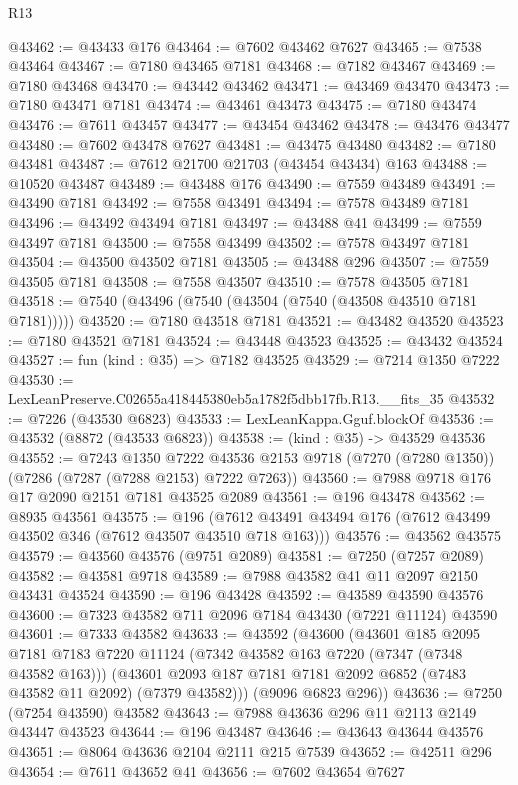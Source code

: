 \begin{lexlean}{R13}
\begin{coremodule}
@43462 := @43433 @176
@43464 := @7602 @43462 @7627
@43465 := @7538 @43464
@43467 := @7180 @43465 @7181
@43468 := @7182 @43467
@43469 := @7180 @43468
@43470 := @43442 @43462
@43471 := @43469 @43470
@43473 := @7180 @43471 @7181
@43474 := @43461 @43473
@43475 := @7180 @43474
@43476 := @7611 @43457
@43477 := @43454 @43462
@43478 := @43476 @43477
@43480 := @7602 @43478 @7627
@43481 := @43475 @43480
@43482 := @7180 @43481
@43487 := @7612 @21700 @21703 (@43454 @43434) @163
@43488 := @10520 @43487
@43489 := @43488 @176
@43490 := @7559 @43489
@43491 := @43490 @7181
@43492 := @7558 @43491
@43494 := @7578 @43489 @7181
@43496 := @43492 @43494 @7181
@43497 := @43488 @41
@43499 := @7559 @43497 @7181
@43500 := @7558 @43499
@43502 := @7578 @43497 @7181
@43504 := @43500 @43502 @7181
@43505 := @43488 @296
@43507 := @7559 @43505 @7181
@43508 := @7558 @43507
@43510 := @7578 @43505 @7181
@43518 := @7540 (@43496 (@7540 (@43504 (@7540 (@43508 @43510 @7181 @7181)))))
@43520 := @7180 @43518 @7181
@43521 := @43482 @43520
@43523 := @7180 @43521 @7181
@43524 := @43448 @43523
@43525 := @43432 @43524
@43527 := fun (kind : @35) => @7182 @43525
@43529 := @7214 @1350 @7222
@43530 := LexLeanPreserve.C02655a418445380eb5a1782f5dbb17fb.R13.__fits_35
@43532 := @7226 (@43530 @6823)
@43533 := LexLeanKappa.Gguf.blockOf
@43536 := @43532 (@8872 (@43533 @6823))
@43538 := (kind : @35) -> @43529 @43536
@43552 := @7243
    @1350
    @7222
    @43536
    @2153
    @9718
    (@7270 (@7280 @1350))
    (@7286 (@7287 (@7288 @2153) @7222 @7263))
@43560 := @7988 @9718 @176 @17 @2090 @2151 @7181 @43525 @2089
@43561 := @196 @43478
@43562 := @8935 @43561
@43575 := @196 (@7612 @43491 @43494 @176 (@7612 @43499 @43502 @346 (@7612 @43507 @43510 @718 @163)))
@43576 := @43562 @43575
@43579 := @43560 @43576 (@9751 @2089)
@43581 := @7250 (@7257 @2089)
@43582 := @43581 @9718
@43589 := @7988 @43582 @41 @11 @2097 @2150 @43431 @43524
@43590 := @196 @43428
@43592 := @43589 @43590 @43576
@43600 := @7323 @43582 @711 @2096 @7184 @43430 (@7221 @11124) @43590
@43601 := @7333 @43582
@43633 := @43592
    (@43600
      (@43601
        @185
        @2095
        @7181
        @7183
        @7220
        @11124
        (@7342 @43582 @163 @7220 (@7347 (@7348 @43582 @163)))
        (@43601 @2093 @187 @7181 @7181 @2092 @6852 (@7483 @43582 @11 @2092) (@7379 @43582)))
      (@9096 @6823 @296))
@43636 := @7250 (@7254 @43590) @43582
@43643 := @7988 @43636 @296 @11 @2113 @2149 @43447 @43523
@43644 := @196 @43487
@43646 := @43643 @43644 @43576
@43651 := @8064 @43636 @2104 @2111 @215 @7539
@43652 := @42511 @296
@43654 := @7611 @43652 @41
@43656 := @7602 @43654 @7627

\end{coremodule}
\end{lexlean}
